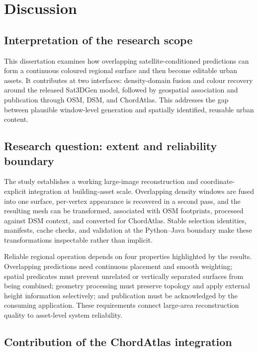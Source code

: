 \chapter{Discussion} \label{Chap5}\label{chap:discussion}

\section{Interpretation of the research scope}

This dissertation examines how overlapping satellite-conditioned predictions
can form a continuous coloured regional surface and then become editable urban
assets.  It contributes at two interfaces: density-domain fusion and colour
recovery around the released Sat3DGen model, followed by geospatial association
and publication through OSM, DSM, and ChordAtlas.  This addresses the gap
between plausible window-level generation and spatially identified, reusable
urban content.

\section{Research question: extent and reliability boundary}

The study establishes a working large-image reconstruction and
coordinate-explicit integration at building-asset scale.  Overlapping density
windows are fused into one surface, per-vertex appearance is recovered in a
second pass, and the resulting mesh can be transformed, associated with OSM
footprints, processed against DSM context, and converted for ChordAtlas.
Stable selection identities, manifests, cache checks, and validation at the
Python--Java boundary make these transformations inspectable rather than
implicit.

Reliable regional operation depends on four properties highlighted by the
results.  Overlapping predictions need continuous placement and smooth
weighting; spatial predicates must prevent unrelated or
vertically separated surfaces from being combined; geometry processing must
preserve topology and apply external height information selectively; and
publication must be acknowledged by the consuming application.  These
requirements connect large-area reconstruction quality to asset-level system
reliability.

\section{Contribution of the ChordAtlas integration}

